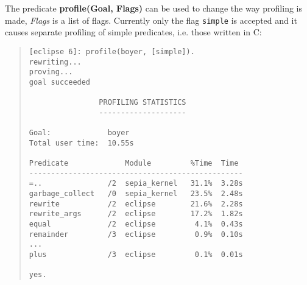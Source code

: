The predicate {\bf profile(Goal, Flags)} can be used to change
the way profiling is made, {\it Flags} is a list of flags.
Currently only the flag {\tt simple} is accepted and it
causes separate profiling of simple predicates, i.e.
those written in C:

\begin{quote}
\begin{verbatim}
[eclipse 6]: profile(boyer, [simple]).
rewriting...
proving...
goal succeeded

                PROFILING STATISTICS
                --------------------

Goal:             boyer
Total user time:  10.55s

Predicate             Module         %Time  Time
-------------------------------------------------
=..               /2  sepia_kernel   31.1%  3.28s
garbage_collect   /0  sepia_kernel   23.5%  2.48s
rewrite           /2  eclipse        21.6%  2.28s
rewrite_args      /2  eclipse        17.2%  1.82s
equal             /2  eclipse         4.1%  0.43s
remainder         /3  eclipse         0.9%  0.10s
...
plus              /3  eclipse         0.1%  0.01s

yes.
\end{verbatim}
\end{quote}


